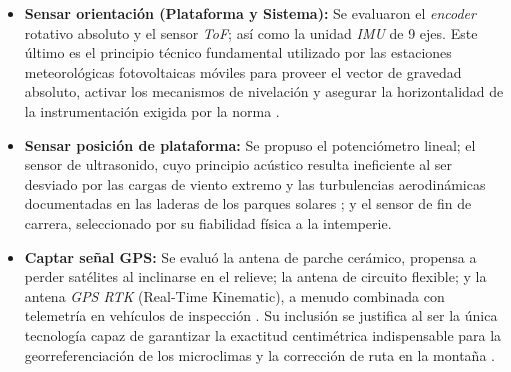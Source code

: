 \documentclass[../../General.tex]{subfiles}
\begin{document}
\begin{itemize}
	\item \textbf{Sensar orientación (Plataforma y Sistema):} Se evaluaron el \textit{encoder} rotativo absoluto y el sensor \textit{ToF}; así como la unidad \textit{IMU} de 9 ejes. Este último es el principio técnico fundamental utilizado por las estaciones meteorológicas fotovoltaicas móviles para proveer el vector de gravedad absoluto, activar los mecanismos de nivelación \citep{CN216956405U} y asegurar la horizontalidad de la instrumentación exigida por la norma \citep{IEC61724-1_2021}.
	
	\item \textbf{Sensar posición de plataforma:} Se propuso el potenciómetro lineal; el sensor de ultrasonido, cuyo principio acústico resulta ineficiente al ser desviado por las cargas de viento extremo y las turbulencias aerodinámicas documentadas en las laderas de los parques solares \citep{Xu2024}; y el sensor de fin de carrera, seleccionado por su fiabilidad física a la intemperie.
	
	\item \textbf{Captar señal GPS:} Se evaluó la antena de parche cerámico, propensa a perder satélites al inclinarse en el relieve; la antena de circuito flexible; y la antena \textit{GPS RTK} (Real-Time Kinematic), a menudo combinada con telemetría en vehículos de inspección \citep{CN116405876A}. Su inclusión se justifica al ser la única tecnología capaz de garantizar la exactitud centimétrica indispensable para la georreferenciación de los microclimas y la corrección de ruta en la montaña \citep{Armstrong2026, Figgis2025}.
\end{itemize}
\end{document}

